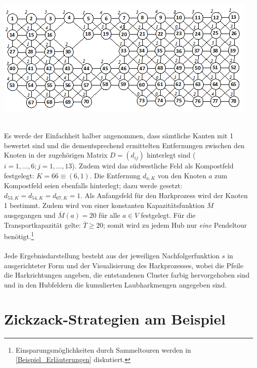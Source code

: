 \begin{center}
\begin{minipage}{\textwidth}
\centerline{\includegraphics[angle=0,scale=1.25]{Figures/Laub/Gartengraph_Beispiel.png}}
\label{Beispiel_Gartengraph}
\end{minipage}
\end{center}

\phantom \\
\noindent Es werde der Einfachheit halber angenommen, dass sämtliche Kanten mit 1 bewertet sind und die dementsprechend ermittelten Entfernungen zwischen den Knoten in der zugehörigen Matrix $D=(d_{ij})$ hinterlegt sind ($i=1,\dots,6; j=1,\dots,13$). Zudem wird das südwestliche Feld als Kompostfeld festgelegt: $K=66 \equiv (6,1)$. Die Entfernung $d_{a,K}$ von den Knoten $a$ zum Kompostfeld seien ebenfalls hinterlegt; dazu werde gesetzt: $d_{53,K}=d_{54,K}=d_{67,K}=1$. Als Anfangsfeld für den Harkprozess wird der Knoten 1 bestimmt. Zudem wird von einer konstanten Kapazitätsfunktion $\overline{M}$ ausgegangen und $\overline{M}(a)=20$ für alle $a \in V$ festgelegt. Für die Transportkapazität gelte: $\overline{T} \geq 20$; somit wird zu jedem Hub nur \textit{eine} Pendeltour benötigt.\footnote{Einsparungsmöglichkeiten durch Sammeltouren werden in \ref{Beispiel_Erläuterungen} diskutiert.}\\
\\
Jede Ergebnisdarstellung besteht aus der jeweiligen Nachfolgerfunktion $s$ in ausgerichteter Form und der Visualisierung des Harkprozesses, wobei die Pfeile die Harkrichtungen angeben, die entstandenen Cluster farbig hervorgehoben sind und in den Hubfeldern die kumulierten Laubharkmengen angegeben sind.

\section{Zickzack-Strategien am Beispiel}\label{sec_Zickzack}

